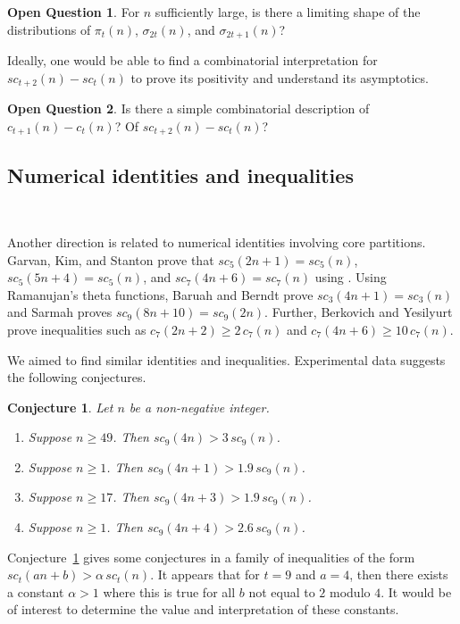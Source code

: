 \documentclass[12pt,leqno]{amsart}
\newtheorem{conj}[lem]{Conjecture}
\numberwithin{equation}{section}
\theoremstyle{definition}
\newtheorem*{question}{Open Question}
\begin{document}
\begin{question}
For $n$ sufficiently large, is there a limiting shape of the distributions of $\pi_t(n)$, $\sigma_{2t}(n)$, and $\sigma_{2t+1}(n)$?
\end{question}

Ideally, one would be able to find a combinatorial interpretation for $sc_{t+2}(n)-sc_t(n)$ to prove its positivity and understand its asymptotics.  

\begin{question}
Is there a simple combinatorial description of $c_{t+1}(n)-c_t(n)$?  Of $sc_{t+2}(n)-sc_t(n)$?
\end{question}

\subsection{Numerical identities and inequalities}\

Another direction is related to numerical identities involving core partitions. Garvan, Kim, and Stanton prove that $sc_5(2n+1) = sc_5(n)$, $sc_5(5n+4)=sc_5(n)$, and $sc_7(4n+6)=sc_7(n)$ using \cite[Equation~(7.4)]{Garvan}. Using Ramanujan's theta functions, Baruah and Berndt \cite{BB} prove $sc_3(4n+1) = sc_3(n)$ and Sarmah \cite{Sarmah-thesis} proves $sc_9(8n + 10) = sc_9(2n)$.  Further, Berkovich and Yesilyurt \cite{BY} prove inequalities such as $c_7(2n+2)\geq 2\,c_7(n)$ and $c_7(4n+6)\geq 10\,c_7(n)$.  

We aimed to find similar identities and inequalities.  Experimental data suggests the following conjectures.

\begin{conj} \label{conj:1.9} Let $n$ be a non-negative integer.  
\begin{enumerate}
\item Suppose $n\geq 49$.  Then $sc_9(4n)>3\,sc_9(n)$.
\item Suppose $n\geq 1$.  Then $sc_9(4n+1)>1.9\,sc_9(n)$.
\item Suppose $n\geq 17$.  Then $sc_9(4n+3)>1.9\,sc_9(n)$.
\item Suppose $n\geq 1$.  Then $sc_9(4n+4)>2.6\,sc_9(n)$.
\end{enumerate}
\end{conj}
Conjecture~\ref{conj:1.9} gives some conjectures in a family of inequalities of the form $sc_t(an+b)>\alpha\,sc_t(n)$.  It appears that for $t=9$ and $a=4$, then there exists a constant $\alpha>1$ where this is true for all $b$ not equal to $2$ modulo $4$.  It would be of interest to determine the value and interpretation of these constants.
\end{document}
